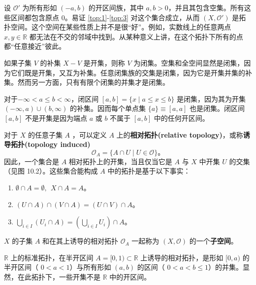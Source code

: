 \begin{eg}\label{eg:10.2}
	设 $\mathcal{O} '$ 为所有形如 $(-a,b)$ 的开区间族，其中 $a,b >0$，并且其包含空集。所有这些区间都包含原点 0。易证 \ref{top:1}-\ref{top:3} 对这个集合成立，从而 $(X,\mathcal{O} ')$ 是拓扑空间。这个空间在某些性质上并不是很“好”。例如，实数线上的任意两点 $x,y\in \mathbb{R}$ 都无法在不交的邻域中找到。从某种意义上讲，在这个拓扑下所有的点都“任意接近”彼此。
\end{eg}

	如果子集 $V$ 的补集 $X-V$ 是开集，则称 $V$ 为闭集。空集和全空间显然是闭集，因为它们既是开集，又互为补集。任意闭集族的交集是闭集，因为它是开集并集的补集。然而另一方面，只有有限个闭集的并集才是闭集。

\begin{eg}\label{eg:10.3}
	 对于$-\infty < a\leq b< \infty $，闭区间 $[a,b]=\{x\mid a\leq x\leq b\}$ 是闭集，因为其为开集 $(-\infty ,a)\cup (b,\infty )$ 的补集。因而每个单点集 $\{a\}\equiv [a,a]$ 也是闭集。闭区间 $[a,b]$ 不是开集是因为端点 $a$ 或 $b$ 不属于 $[a,b]$ 中的任何开区间。
\end{eg}

对于 $X$ 的任意子集 $A$ ，可以定义 $A$ 上的\textbf{相对拓扑(relative topology)}，或称\textbf{诱导拓扑(topology induced)}
\begin{equation*}
\mathcal{O}_{A} =\{A\cap U\mid U\in \mathcal{O} \}。
\end{equation*}
因此，一个集合是 $A$ 相对拓扑上的开集，当且仅当它是 $A$ 与 $X$ 中开集 $U$ 的交集（见图 10.2）。这些集合能构成 $A$ 中的拓扑是基于以下事实：

\begin{enumerate}[label=(\arabic*)]
	\item		$\emptyset \cap A=\emptyset ,\ \ X\cap A=A$。
	\item		$(U\cap A)\cap (V\cap A)=(U\cap V)\cap A$。
	\item		$\bigcup _{i\in I} (U_{i} \cap A)=\left(\bigcup _{i\in I} U_{i}\right) \cap A$。
\end{enumerate}

 $X$ 的子集 $A$ 和在其上诱导的相对拓扑 $\mathcal{O}_{A}$ 一起称为 $(X,\mathcal{O} )$ 的一个\textbf{子空间}。

\begin{eg}\label{eg:10.4}
	$\mathbb{R}$ 上的标准拓扑，在半开区间 $A=[ 0,1)\subset \mathbb{R}$ 上诱导的相对拓扑，是形如 $[0,a)$ 的半开区间（ $0< a< 1$）与所有形如 $(a,b)$ 的区间（ $0< a< b\leq 1$）的并集。显然，在此拓扑下，一些开集不是 $\mathbb{R}$ 中的开区间。
\end{eg}

